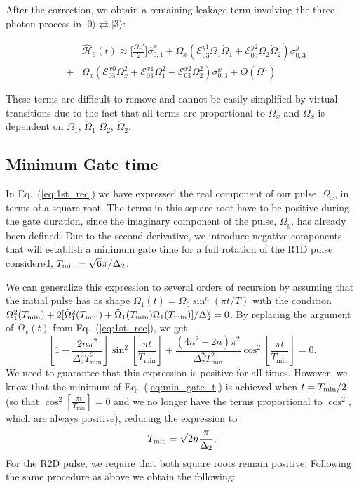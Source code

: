 \documentclass[superscriptaddress,amsmath,amssymb,aps,twocolumn,praplied,notitlepage]{revtex4-2}
\newcommand{\ket}[1]{\vert #1 \rangle}
\begin{document}
 After the correction, we obtain a remaining leakage term involving the three-photon process in $\ket{0}\rightleftarrows\ket{3}$:

\begin{eqnarray}
    &&\hat{\mathcal{H}}_6(t) \approx \bigg[\frac{\Omega_x'}{2}\bigg]\hat{\sigma}_{0,1}^x+ \Omega_x(\mathcal{E}^{y1}_{03}\Omega_1\dot{\Omega}_1+ \mathcal{E}^{y2}_{03}\Omega_2\dot{\Omega}_2)\sigma_{0,3}^y \nonumber \\
    &+& \Omega_x(\mathcal{E}^{x0}_{03}\Omega_x^2+\mathcal{E}^{x1}_{03}\Omega_1^2+\mathcal{E}^{x2}_{03}\Omega_2^2)\sigma_{0,3}^x + O(\Omega^4)
\end{eqnarray}


These terms are difficult to remove and cannot be easily simplified by virtual transitions due to the fact that all terms are proportional to $\Omega_x$ and $\Omega_x$ is dependent on $\dot{\Omega}_1$, $\ddot{\Omega}_1$
$\dot{\Omega}_2$, $\ddot{\Omega}_2$.\\



\subsection{Minimum Gate time}

{In  Eq.~(\ref{eq:1st_rec}) we have expressed the real component of our pulse, $\Omega_x$, in terms of a square root. The terms in this square root have to be positive during the gate duration, since the imaginary component of the pulse, $\Omega_y$, has already been defined. Due to the second derivative, we introduce negative components that will establish a minimum gate time for a full rotation of the R1D pulse considered, $T_{{\rm{min}}} = \sqrt{6}\pi/\Delta_2$}.


We can generalize this expression to several orders of recursion by assuming that the initial pulse has as shape $\Omega_{1}(t)=\Omega_{0}\sin^n(\pi t/T)$ with the condition $\Omega_1^2(T_{{\rm{min}}}) + 2[\dot{\Omega}^2_1(T_{{\rm{min}}}) +\ddot{\Omega}_1(T_{{\rm{min}}})\Omega_1(T_{{\rm{min}}})]/\Delta_2^2 =0$. By replacing the argument of $\Omega_{x}(t)$ from Eq.~(\ref{eq:1st_rec}), we get
\begin{equation}
\left[1 - \frac{2n\pi^{2}}{\Delta_{2}^{2} T_{\min}^{2}}\right]
\sin^{2}\!\left[\frac{\pi t}{T_{\min}}\right]
+ \frac{(4n^2-2n)\pi^{2}}{\Delta_2^2T_{\min}^{2}}
\cos^{2}\!\left[\frac{\pi t}{T_{\min}}\right] = 0.
\label{eq:min_gate_t}
\end{equation}
We need to guarantee that this expression is positive for all times. However, we know that the minimum of Eq.~(\ref{eq:min_gate_t}) is achieved when $t=T_{{\rm{min}}}/2$ {(so that $\cos^{2}\!\left[\frac{\pi t}{T_{\min}}\right]=0$ and we no longer have the terms proportional to $\cos^2$, which are always positive)}, reducing the expression to
\begin{equation}
    T_{{\rm{min}}}=\sqrt{2n}\frac{\pi}{\Delta_2}.
\end{equation}
For the R2D pulse, we require that both square roots remain positive. Following the same procedure as above we obtain the following:
\end{document}
